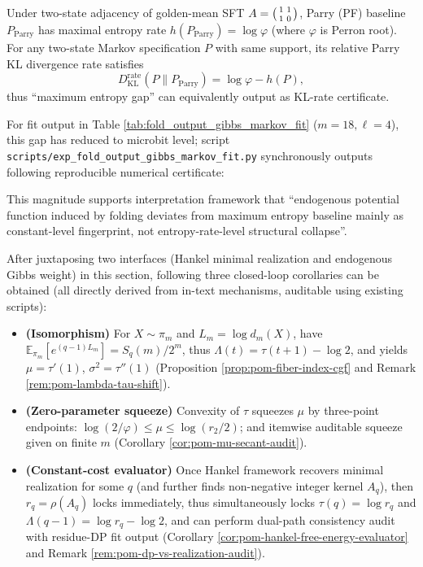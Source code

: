 \begin{remark}\label{rem:pom-gibbs-parry-entropy-gap}
Under two-state adjacency of golden-mean SFT
\(
A=\begin{psmallmatrix}1&1\\[2pt]1&0\end{psmallmatrix}
\),
Parry (PF) baseline \(P_{\mathrm{Parry}}\) has maximal entropy rate
\(
h(P_{\mathrm{Parry}})=\log\varphi
\)
(where \(\varphi\) is Perron root).
For any two-state Markov specification \(P\) with same support, its relative Parry KL divergence rate satisfies
\[
D_{\mathrm{KL}}^{\mathrm{rate}}(P\|P_{\mathrm{Parry}})=\log\varphi-h(P),
\]
thus ``maximum entropy gap'' can equivalently output as KL-rate certificate.
\par
For fit output in Table \ref{tab:fold_output_gibbs_markov_fit} (\(m=18,\ell=4\)), this gap has reduced to microbit level; script \texttt{scripts/exp\_fold\_output\_gibbs\_markov\_fit.py} synchronously outputs following reproducible numerical certificate:

This magnitude supports interpretation framework that ``endogenous potential function induced by folding deviates from maximum entropy baseline mainly as constant-level fingerprint, not entropy-rate-level structural collapse''.
\end{remark}

\begin{remark}\label{rem:pom-interface-loop-collision-loss}
After juxtaposing two interfaces (Hankel minimal realization and endogenous Gibbs weight) in this section, following three closed-loop corollaries can be obtained (all directly derived from in-text mechanisms, auditable using existing scripts):
\begin{itemize}
  \item \textbf{(Isomorphism)} For \(X\sim\pi_m\) and \(L_m=\log d_m(X)\), have
  \(\mathbb{E}_{\pi_m}[e^{(q-1)L_m}]=S_q(m)/2^m\), thus \(\Lambda(t)=\tau(t+1)-\log2\), and yields \(\mu=\tau'(1)\), \(\sigma^2=\tau''(1)\) (Proposition \ref{prop:pom-fiber-index-cgf} and Remark \ref{rem:pom-lambda-tau-shift}).
  \item \textbf{(Zero-parameter squeeze)} Convexity of \(\tau\) squeezes \(\mu\) by three-point endpoints: \(\log(2/\varphi)\le \mu\le \log(r_2/2)\); and itemwise auditable squeeze given on finite \(m\) (Corollary \ref{cor:pom-mu-secant-audit}).
  \item \textbf{(Constant-cost evaluator)} Once Hankel framework recovers minimal realization for some \(q\) (and further finds non-negative integer kernel \(A_q\)), then \(r_q=\rho(A_q)\) locks immediately, thus simultaneously locks \(\tau(q)=\log r_q\) and \(\Lambda(q-1)=\log r_q-\log2\), and can perform dual-path consistency audit with residue-DP fit output (Corollary \ref{cor:pom-hankel-free-energy-evaluator} and Remark \ref{rem:pom-dp-vs-realization-audit}).
\end{itemize}
\end{remark}
